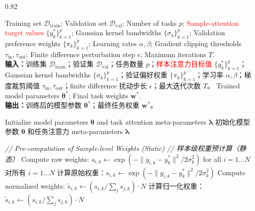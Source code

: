 \documentclass[11pt]{article}
\begin{document}
\begin{algorithm}[!htbp]
	\caption{DA-DGP modeling workflow.}
	\caption*{DA-DGP 建模流程。}
	\label{alg:da_dgp}
	\begin{spacing}{0.82}
	\footnotesize
		\vspace{-0.2\baselineskip}
	\begin{algorithmic}[1] %
		\Require Training set $\mathcal{D}_{\text{train}}$; Validation set $\mathcal{D}_{\text{val}}$; Number of tasks $p$; \textcolor{red}{Sample-attention target values} $\{y_{k}^{*}\}_{k=1}^{p}$; Gaussian kernel bandwidths $\{\sigma _{k}\}_{k=1}^{p}$; Validation preference weights $\{\pi _{k}\}_{k=1}^{p}$; Learning rates $\alpha, \beta$; Gradient clipping thresholds $\tau_{\text{in}}, \tau_{\text{out}}$; Finite difference perturbation step $\epsilon$; Maximum iterations $T$.\\
		\textbf{输入：}训练集 $\mathcal{D}_{\text{train}}$；验证集 $\mathcal{D}_{\text{val}}$；任务数量 $p$；\textcolor{red}{样本注意力目标值} $\{y_{k}^{*}\}_{k=1}^{p}$；Gaussian kernel bandwidths $\{\sigma _{k}\}_{k=1}^{p}$；验证偏好权重 $\{\pi _{k}\}_{k=1}^{p}$；学习率 $\alpha, \beta$；梯度裁剪阈值 $\tau_{\text{in}}, \tau_{\text{out}}$；finite difference 扰动步长 $\epsilon$；最大迭代次数 $T$。
		\Ensure Trained model parameters $\boldsymbol{\theta}^*$; Final task weights $\mathbf{w}^*$.\\
		\textbf{输出：}训练后的模型参数 $\boldsymbol{\theta}^*$；最终任务权重 $\mathbf{w}^*$。
		
		\State Initialize model parameters $\boldsymbol{\theta}$ and task attention meta-parameters $\boldsymbol{\lambda}$
		\State 初始化模型参数 $\boldsymbol{\theta}$ 和任务注意力 meta-parameters $\boldsymbol{\lambda}$
		
		\State \textit{// Pre-computation of Sample-level Weights (Static)}
		\State \textit{// 样本级权重预计算（静态）}
		\State Compute raw weights: $s_{i,k} \gets \exp (-\|y_{i,k}-y_{k}^{*}\|^2 / 2\sigma_{k}^{2})$ for all $i=1 \dots N$
		\State 对所有 $i=1 \dots N$ 计算原始权重：$s_{i,k} \gets \exp (-\|y_{i,k}-y_{k}^{*}\|^2 / 2\sigma_{k}^{2})$
		\State Compute normalized weights: $\tilde{s}_{i,k} \gets (s_{i,k} / \sum_{j} s_{j,k}) \cdot N$
		\State 计算归一化权重：$\tilde{s}_{i,k} \gets (s_{i,k} / \sum_{j} s_{j,k}) \cdot N$
		\EndFor
		

\end{algorithmic}
\end{spacing}
\end{algorithm}
\end{document}
